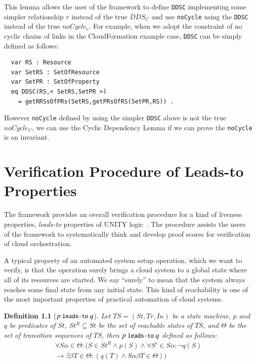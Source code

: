 \documentclass[12pt]{report}
\newtheorem{definition}{Definition}
\newcommand{\ra}{\rightarrow}
\newcommand{\mbstt}[1]{\mbox{\small{\tt {#1}}}}
\newcommand{\ul}{\underline}
\begin{document}
This lemma allows the user of the framework to define {\tt DDSC}
implementing some simpler relationship $r$ instead of the true $DDS_C$
and use {\tt noCycle} using the {\tt DDSC} instead of the true
$noCycle_c$. For example, when we adopt the constraint of no cyclic
chains of links in the CloudFormation example case, {\tt DDSC} can be
simply defined as follows:
\small
\begin{verbatim}
  var RS : Resource
  var SetRS : SetOfResource
  var SetPR : SetOfProperty
  eq DDSC(RS,< SetRS,SetPR >)
    = getRRSsOfPRs(SetRS,getPRsOfRS(SetPR,RS)) .
\end{verbatim}
\normalsize
However {\tt noCycle} defined by using the simpler {\tt DDSC} above is
 not the true $noCycle_C$, we can use the Cyclic Dependency Lemma if
 we can prove the {\tt noCycle} is an invariant.

\chapter{Verification Procedure of Leads-to Properties}
\label{chap:verification}
The framework provides an overall verification procedure for a kind of
liveness properties, {\it leads-to} properties of UNITY
logic~\cite{DBLP:books/daglib/0067338}.  The procedure assists the
users of the framework to systematically think and develop proof
scores for verification of cloud orchestration.

A typical property of an automated system setup operation, which we
want to verify, is that the operation surely brings a cloud system to
a global state where all of its resources are started.  We say ``surely''
to mean that the system always reaches some final state from any
initial state. This kind of reachability is one of the most important
properties of practical automation of cloud systems.

\begin{definition}[$p~\mbstt{leads-to}~q$]
  Let $TS=(St,Tr,In)$ be a state machine, $p$ and $q$ be predicates of
  $St$, $St^R\subseteq St$ be the set of reachable states of $TS$, and
  $\Theta$ be the set of transition sequences of $TS$, then
  \ul{$p~\mbstt{leads-to}~q$} defined as follows:
  \begin{eqnarray*}
  \forall S\alpha\in \Theta: (S\in St^R \land p(S) \land
  \forall S'\in S\alpha: \neg q(S)\\
  \ra \exists \beta T\in \Theta:(q(T) \land S\alpha\beta T\in \Theta))
  \end{eqnarray*}
\end{definition}
\end{document}
